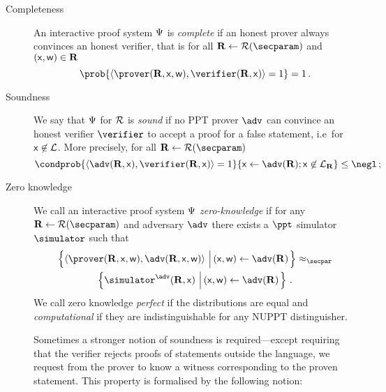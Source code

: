 \documentclass[runningheads,11pt]{llncs}
\theoremstyle{definition}
\begin{document}
\begin{description}
	\item[Completeness] An interactive proof system $\mathrm{\Psi}$ is \emph{complete} if an honest prover always convinces an honest verifier, that is for all $\REL \gets \RELGEN(\secparam)$ and $(\mathsf{x}, \mathsf{w}) \in \mathbf{R}$
	\[
		\prob{\ip{\prover (\REL, \inp, \wit)}{\verifier (\REL, \inp)} = 1} = 1\,.
	\]
	\item[Soundness] We say that $\mathrm{\Psi}$ for $\mathcal{R}$ is \emph{sound} if no PPT prover $\adv$ can convince an honest verifier $\verifier$ to accept a proof for a false statement, i.e~for $\mathsf{x} \not\in\mathcal{L}$. More precisely, for all $\REL \gets \RELGEN(\secparam)$
	\[
		\condprob{\ip{\adv(\REL, \inp)}{\verifier(\REL, \inp)} = 1}{\inp \gets \adv(\REL); \inp \not\in \LANG_\REL} \leq \negl\,;
	\]
	\item[Zero knowledge] We call an interactive proof system $\mathrm{\Psi}$ \emph{zero-knowledge} if for any $\REL \gets \RELGEN(\secparam)$ and adversary $\adv$ there exists a $\ppt$ simulator $\simulator$ such that
	\begin{multline*}
	  \left\{\ip{\prover(\REL, \inp, \wit)}{\adv(\REL, \inp, \wit)} \,\left|\, (\inp, \wit) \gets \adv(\REL)\vphantom{\simulator^\adv}\right.\right\} \approx_\secpar
		\\
		\left\{\simulator^{\adv}(\REL, \inp)\,\left|\, (\inp, \wit) \gets \adv(\REL)\vphantom{\simulator^\adv}\right.\right\}\,.
	\end{multline*}
	We call zero knowledge \emph{perfect} if the distributions are equal and \emph{computational} if they are indistinguishable for any NUPPT distinguisher.
	
	Sometimes a stronger notion of soundness is required---except requiring that the verifier rejects proofs of statements outside the language, we request from the prover to know a witness corresponding to the proven statement. This property is formalised by the following notion:
	

\end{description}
\end{document}
